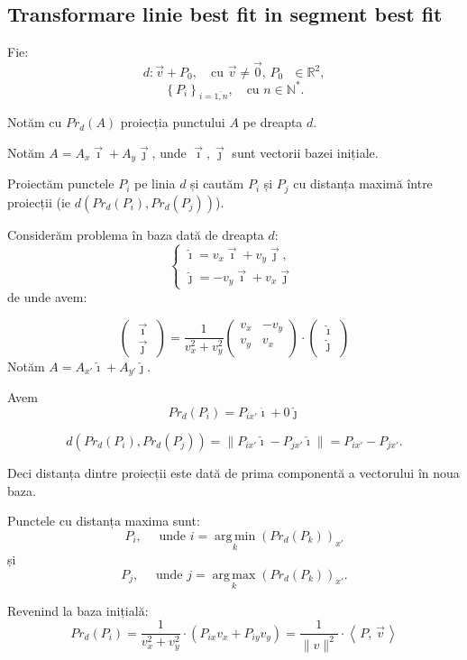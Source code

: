 \documentclass{article}
\renewcommand{\Pr}[1]{Pr_d(#1)}
\newcommand{\ivec}{\vec{\imath}}
\newcommand{\jvec}{\vec{\jmath}}
\newcommand{\ihat}{\hat{\imath}}
\newcommand{\jhat}{\hat{\jmath}}
\newcommand{\vect}[2]{\left(\;\begin{matrix}#1\\#2\end{matrix}\;\right)}
\DeclareMathOperator*{\argmax}{arg\,max}
\DeclareMathOperator*{\argmin}{arg\,min}
\begin{document}
\subsection*{Transformare linie best fit in segment best fit}

Fie:
\[ d: \vec{v} + P_0,\quad \text{cu $\vec{v}\ne\vec{0}$, $P_0$ $\in \mathbb{R}^2$}, \]
\[ \left\{ P_i \right\} _{i=\overline{1,n}},\quad \text{cu $n\in \mathbb{N}^*$}. \]

Notăm cu $\Pr{A}$ proiecția punctului $A$ pe dreapta $d$.
\smallskip

Notăm $A = A_x \ivec+ A_y\jvec$, unde $\ivec, \jvec $ sunt vectorii bazei inițiale.
\medskip


Proiectăm punctele $P_i$ pe linia $d$ și cautăm $P_i$ și $P_j$ cu
distanța maximă între proiecții (ie $d(\Pr{P_i}, \Pr{P_j})$).

\medskip

Considerăm problema în baza dată de dreapta $d$:
\[
\begin{cases}%
  \ihat = v_x \ivec+ v_y\jvec,\\
  \jhat = -v_y \ivec+ v_x\jvec\,
\end{cases}%
\]
de unde avem:

\[
\vect{\ivec}{\jvec}
=
\frac{1}{v_x^2+v_y^2}
\begin{pmatrix}
  v_x & -v_y\\
  v_y & v_x\\
\end{pmatrix}
\cdot
\vect{\ihat}{\jhat}
\]
Notăm $A = A_{x'} \ihat+ A_{y'}\jhat$.
\medskip

Avem
\[\Pr{P_i} = P_{ix'}\ihat+0\jhat\]

\[d(\Pr{P_i}, \Pr{P_j}) = \| P_{ix'}\ihat - P_{jx'}\ihat \| =
 P_{ix'} - P_{jx'}.\]

Deci distanța dintre proiecții este dată de prima componentă a vectorului în noua baza.

Punctele cu distanța maxima sunt:
\[P_i, \quad\text{ unde } i = \argmin\limits_k (\Pr{P_k})_{x'}  \]
și
\[P_j, \quad\text{ unde } j = \argmax\limits_k (\Pr{P_k})_{x'}. \]

Revenind la baza inițială:
\[
\Pr{P_i} = \frac{1}{v^2_x+v^2_y} \cdot (P_{ix} v_x + P_{iy} v_y)
= \frac{1}{\|v\|^2} \cdot \left\langle\,P,\, \vec{v}\,\right\rangle
 \]

\end{document}
